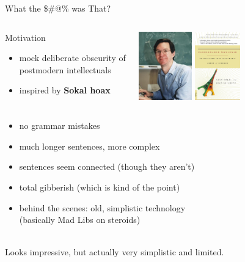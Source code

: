 \documentclass[xcolor={usenames,svgnames,x11names,dvipsnames,table}]{beamer}
\begin{document}
\begin{frame}{What the \$\#@\% was That?}
    \begin{columns}

        \begin{block}{Motivation}
            \begin{itemize}
                \item mock deliberate obscurity of\\
                    postmodern intellectuals
                \item inspired by \textbf{Sokal hoax}
            \end{itemize}
        \end{block}
        
        \centering
        \includegraphics[height=8em]{./img/sokal}
        \hspace{2em}
        \includegraphics[height=8em]{./img/fashionable_nonsense}
    \end{columns}

    \pause
    \begin{itemize}
        \item no grammar mistakes
        \item much longer sentences, more complex
        \item sentences seem connected (though they aren't)
        \item total gibberish (which is kind of the point)
        \item behind the scenes: old, simplistic technology\\
            (basically Mad Libs on steroids)
    \end{itemize}

    \\
    Looks impressive, but actually very simplistic and limited.
\end{frame}
\end{document}
